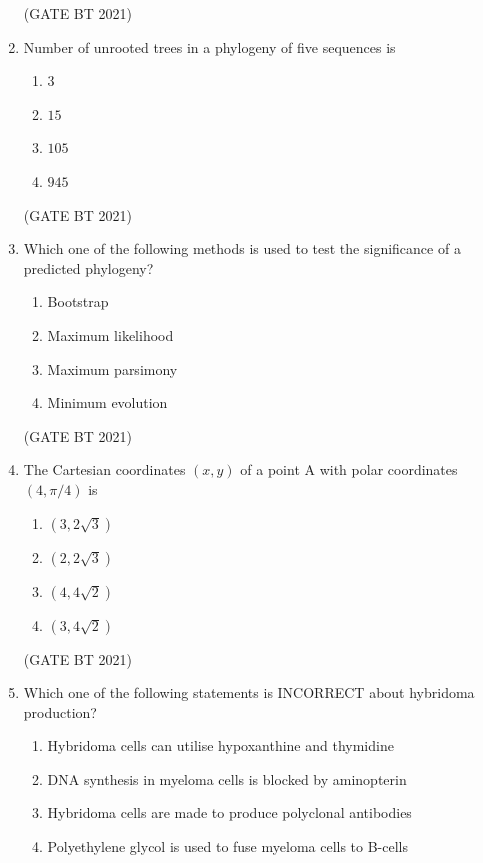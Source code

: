 \documentclass[journal,12pt,onecolumn]{IEEEtran}
\theoremstyle{remark}
\begin{document}
\begin{enumerate}
\hfill (GATE BT 2021)

\item Number of unrooted trees in a phylogeny of five sequences is

\begin{enumerate}
\item $3$
\item $15$
\item $105$
\item $945$
\end{enumerate}

\hfill (GATE BT 2021)

\item Which one of the following methods is used to test the significance of a predicted phylogeny?

\begin{enumerate}
\item Bootstrap
\item Maximum likelihood
\item Maximum parsimony
\item Minimum evolution
\end{enumerate}

\hfill (GATE BT 2021)

\item The Cartesian coordinates $(x, y)$ of a point A with polar coordinates $(4, \pi/4)$ is

\begin{enumerate}
\item $(3,2\sqrt{3})$
\item $(2, 2\sqrt{3})$
\item $(4,4\sqrt{2})$
\item $(3,4\sqrt{2})$
\end{enumerate}

\hfill (GATE BT 2021)

\item Which one of the following statements is INCORRECT about hybridoma production?

\begin{enumerate}
\item Hybridoma cells can utilise hypoxanthine and thymidine
\item DNA synthesis in myeloma cells is blocked by aminopterin
\item Hybridoma cells are made to produce polyclonal antibodies
\item Polyethylene glycol is used to fuse myeloma cells to B-cells
\end{enumerate}


\end{enumerate}
\end{document}
